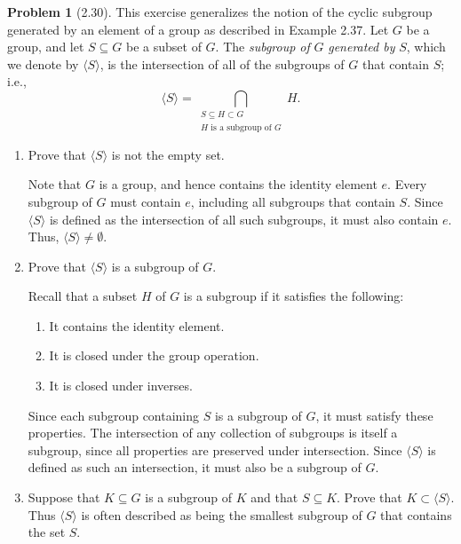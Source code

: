 \documentclass[12pt]{article}
\theoremstyle{definition}
\newtheorem{problem}{Problem}
\begin{document}
\begin{problem}[2.30]
    This exercise generalizes the notion of the cyclic subgroup generated by an element of a group as described in Example 2.37.
    Let $G$ be a group, and let $S \subseteq G$ be a subset of $G$. The \textit{subgroup of} $G$ \textit{generated by} $S$, which
    we denote by $\langle S \rangle$, is the intersection of all of the subgroups of $G$ that contain $S$; i.e.,
    \[
        \langle S \rangle = \bigcap_{\substack{S \subseteq H \subset G\\ H \text{ is a subgroup of } G}} H.
    \]
    \begin{enumerate}[label=(\alph*)]
        \item Prove that $\langle S \rangle$ is not the empty set.
        
            \begin{solution}
                Note that $G$ is a group, and hence contains the identity element $e$. Every subgroup of $G$ must contain $e$, including all subgroups that contain $S$. Since $\langle S \rangle$ is defined as the intersection of all such subgroups, it must also contain $e$. Thus, $\langle S \rangle \neq \emptyset$.

            \end{solution}
        \item Prove that $\langle S \rangle$ is a subgroup of $G$.
        
            \begin{solution}
                Recall that a subset $H$ of $G$ is a subgroup if it satisfies the following:
                \begin{enumerate}[label=(\roman*)]
                    \item It contains the identity element.
                    \item It is closed under the group operation.
                    \item It is closed under inverses.
                \end{enumerate}
                Since each subgroup containing $S$ is a subgroup of $G$, it must satisfy these properties. The intersection of any collection of subgroups is itself a subgroup, since all properties are preserved under intersection. Since $\langle S \rangle$ is defined as such an intersection, it must also be a subgroup of $G$.
            
            \end{solution}
        \item Suppose that $K \subseteq G$ is a subgroup of $K$ and that $S \subseteq K$. Prove that $K \subset \langle S \rangle$. 
              Thus $\langle S \rangle$ is often described as being the smallest subgroup of $G$ that contains the set $S$.


\end{enumerate}
\end{problem}
\end{document}
